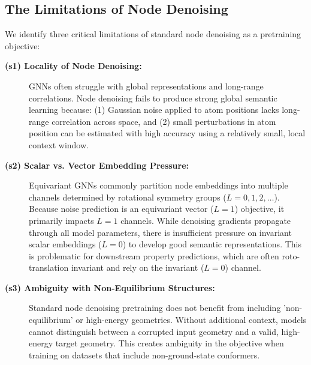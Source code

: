 \documentclass{article}
\theoremstyle{plain}
\theoremstyle{definition}
\theoremstyle{remark}
\begin{document}
\subsection{The Limitations of Node Denoising}

We identify three critical limitations of standard node denoising as a pretraining objective:

\begin{description}
\item[\textbf{(s1) Locality of Node Denoising:}] 
GNNs often struggle with global representations and long-range correlations. Node denoising fails to produce strong global semantic learning because: (1) Gaussian noise applied to atom positions lacks long-range correlation across space, and (2) small perturbations in atom position can be estimated with high accuracy using a relatively small, local context window.

\item[\textbf{(s2) Scalar vs. Vector Embedding Pressure:}] 
 Equivariant GNNs commonly partition node embeddings into multiple channels determined by rotational symmetry groups ($L=0, 1, 2, \dots$). Because noise prediction is an equivariant vector ($L=1$) objective, it primarily impacts $L=1$ channels. While denoising gradients propagate through all model parameters, there is insufficient pressure on invariant scalar embeddings ($L=0$) to develop good semantic representations. This is problematic for downstream property predictions, which are often roto-translation invariant and rely on the invariant ($L=0$) channel.

\item[\textbf{(s3) Ambiguity with Non-Equilibrium Structures:}] 
Standard node denoising pretraining does not benefit from including 'non-equilibrium' or high-energy geometries. Without additional context,  models cannot distinguish between a corrupted input geometry and a valid, high-energy target geometry. This creates ambiguity in the objective when training on datasets that include non-ground-state conformers.
\end{description}
\end{document}
